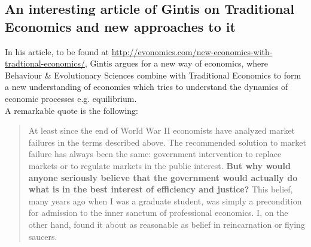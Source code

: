 \subsection*{An interesting article of Gintis on Traditional Economics and new approaches to it}
In his article, to be found at \url{http://evonomics.com/new-economics-with-tradtional-economics/}, Gintis argues for a new way of economics, where Behaviour \& Evolutionary Sciences combine with Traditional Economics to form a new understanding of economics which tries to understand the dynamics of economic processes e.g. equilibrium. \\

A remarkable quote is the following:

\begin{quote}
At least since the end of World War II economists have analyzed market failures in the terms described above. The recommended solution to market failure has always been the same: government intervention to replace markets or to regulate markets in the public interest. \textbf{But why would anyone seriously believe that the government would actually do what is in the best interest of efficiency and justice?} This belief, many years ago when I was a graduate student, was simply a precondition for admission to the inner sanctum of professional economics. I, on the other hand, found it about as reasonable as belief in reincarnation or flying saucers.
\end{quote}

